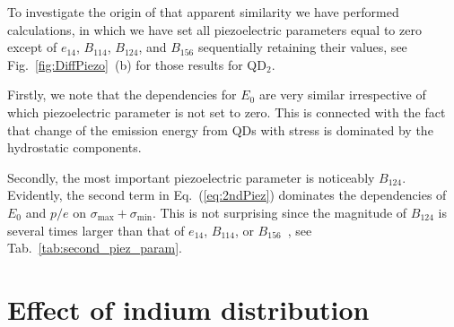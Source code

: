 %


To investigate the origin of that apparent similarity we have performed calculations, in which we have set all piezoelectric parameters equal to zero except of $e_{14}$, $B_{114}$, $B_{124}$, and $B_{156}$ sequentially retaining their values, see Fig.~\ref{fig:DiffPiezo}~(b) for those results for QD$_2$. 


Firstly, we note that the dependencies for $E_0$ are very similar irrespective of which piezoelectric parameter is not set to zero. This is connected with the fact that change of the emission energy from QDs with stress is dominated by the hydrostatic components.

Secondly, the most important piezoelectric parameter is noticeably $B_{124}$. Evidently, the second term in Eq.~(\ref{eq:2ndPiez}) dominates the dependencies of $E_0$ and $p/e$ on $\sigma_{\mathrm{max}}+\sigma_{\mathrm{min}}$. This is not surprising since the magnitude of $B_{124}$ is several times larger than that of $e_{14}$, $B_{114}$, or $B_{156}$~\cite{Beya-Wakata2011}, see Tab.~\ref{tab:second_piez_param}. 


\section{Effect of indium distribution}

